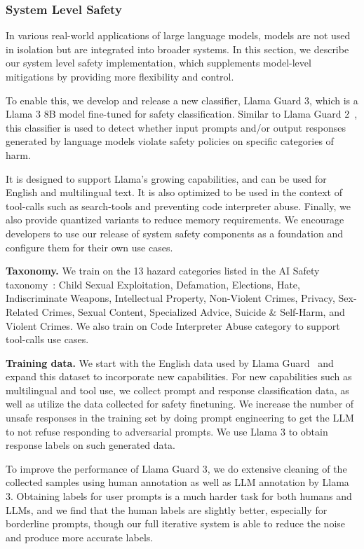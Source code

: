 \documentclass[dvipsnames]{fairmeta}
\begin{document}
\subsubsection{System Level Safety}
\label{section:sls}                      

In various real-world applications of large language models, models are not used in isolation but are integrated into broader systems. In this section, we describe our system level safety implementation, which supplements model-level mitigations by providing more flexibility and control. 

To enable this, we develop and release a new classifier, Llama Guard 3, which is a Llama 3 8B model fine-tuned for safety classification. Similar to Llama Guard 2~\citep{metallamaguard2}, this classifier is used to detect whether input prompts and/or output responses generated by language models violate safety policies on specific categories of harm. 

It is designed to support Llama's growing capabilities, and can be used for English and multilingual text. It is also optimized to be used in the context of tool-calls such as search-tools and preventing code interpreter abuse. Finally, we also provide quantized variants to reduce memory requirements. We encourage developers to use our release of system safety components as a foundation and configure them for their own use cases.

\textbf{Taxonomy.}
We train on the 13 hazard categories listed in the AI Safety taxonomy~\citep{vidgen2024introducing}: Child Sexual Exploitation, Defamation, Elections, Hate, Indiscriminate Weapons, Intellectual Property, Non-Violent Crimes, Privacy, Sex-Related Crimes, Sexual Content, Specialized Advice, Suicide \& Self-Harm, and Violent Crimes. We also train on Code Interpreter Abuse category to support tool-calls use cases. 

\textbf{Training data.}
We start with the English data used by Llama Guard~\citep{inan2023llamaguard} and expand this dataset to incorporate new capabilities. For new capabilities such as multilingual and tool use, we collect prompt and response classification data, as well as utilize the data collected for safety finetuning. We increase the number of unsafe responses in the training set by doing prompt engineering to get the LLM to not refuse responding to adversarial prompts. We use Llama 3 to obtain response labels on such generated data.

To improve the performance of Llama Guard 3, we do extensive cleaning of the collected samples using human annotation as well as LLM annotation by Llama 3.
Obtaining labels for user prompts is a much harder task for both humans and LLMs, and we find that the human labels are slightly better, especially for borderline prompts, though our full iterative system is able to reduce the noise and produce more accurate labels.
\end{document}
